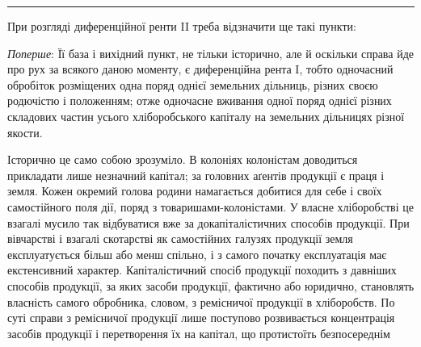 \pfbreak

При розгляді диференційної ренти II треба відзначити ще такі пункти:

\emph{Поперше}: Її база і вихідний пункт, не тільки історично, але й оскільки
справа йде про рух за всякого даною моменту, є диференційна рента I, тобто
одночасний обробіток розміщених одна поряд однієї земельних дільниць, різних
своєю родючістю і положенням; отже одночасне вживання одної поряд однієї
різних складових частин усього хліборобського капіталу на земельних дільницях
різної якости.

Історично це само собою зрозуміло. В колоніях колоністам доводиться прикладати
лише незначний капітал; за головних аґентів продукції є праця і земля.
Кожен окремий голова родини намагається добитися для себе і своїх самостійного
поля дії, поряд з товаришами-колоністами. У власне хліборобстві це
взагалі мусило так відбуватися вже за докапіталістичних способів продукції. При
вівчарстві і взагалі скотарстві як самостійних галузях продукції земля експлуатується
більш або менш спільно, і з самого початку експлуатація має екстенсивний
характер. Капіталістичний спосіб продукції походить з давніших способів
продукції, за яких засоби продукції, фактично або юридично, становлять
власність самого обробника, словом, з ремісничої продукції в хліборобств. По
суті справи з ремісничої продукції лише поступово розвивається концентрація
засобів продукції і перетворення їх на капітал, що протистоїть безпосереднім
\parbreak{}  %
